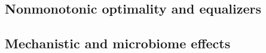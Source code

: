\documentclass[11pt]{article}
\numberwithin{equation}{section}
\theoremstyle{plain}
\theoremstyle{definition}
\theoremstyle{remark}
\begin{document}
\subsection*{Nonmonotonic optimality and equalizers}



\subsection*{Mechanistic and microbiome effects}









{\makeatletter\def\label#1{}\makeatother}


\end{document}
